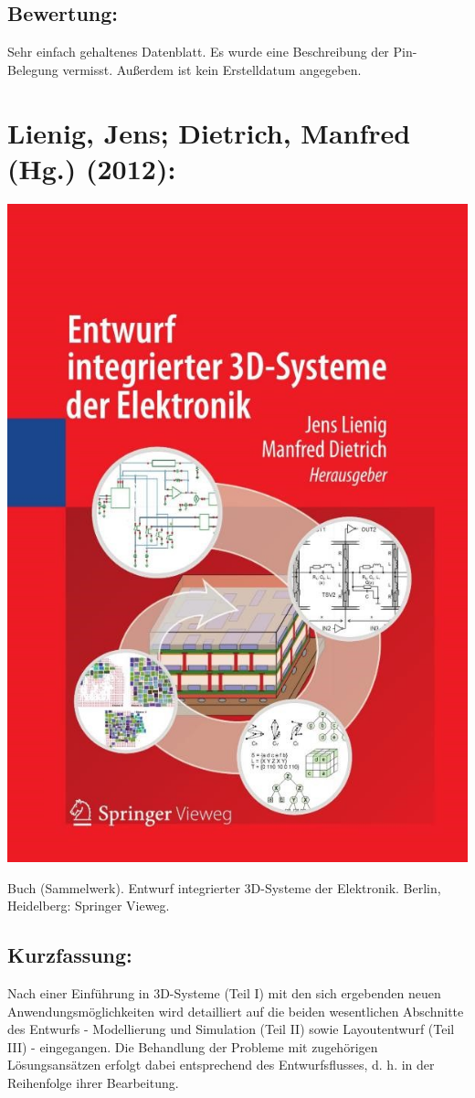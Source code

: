 \subsection*{Bewertung:}
Sehr einfach gehaltenes Datenblatt. Es wurde eine Beschreibung der Pin-Belegung vermisst. Außerdem ist kein Erstelldatum angegeben.

\section*{Lienig, Jens; Dietrich, Manfred (Hg.) (2012):}
\begin{minipage}{0.5\textwidth}
	\includegraphics[width=\linewidth]{../Appendix/Literaturverzeichnis/img/Lienig.jpg}
\end{minipage}
\hfill
\begin{minipage}{0.48\textwidth}
Buch (Sammelwerk). Entwurf integrierter 3D-Systeme der Elektronik.
Berlin, Heidelberg: Springer Vieweg.
\subsection*{Kurzfassung:}
Nach einer Einführung in 3D-Systeme (Teil I) mit den sich ergebenden neuen Anwendungsmöglichkeiten wird detailliert auf die beiden wesentlichen Abschnitte des Entwurfs - Modellierung und Simulation (Teil II) sowie Layoutentwurf (Teil III) - eingegangen. Die Behandlung der Probleme mit zugehörigen Lösungsansätzen erfolgt dabei entsprechend des Entwurfsflusses, d. h. in der Reihenfolge ihrer Bearbeitung.
\end{minipage}
